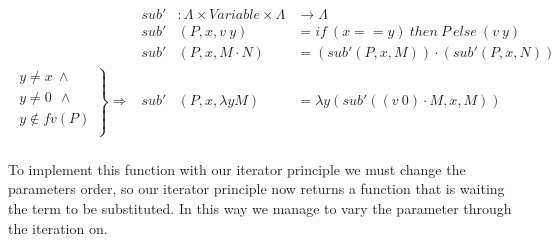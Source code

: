 \documentclass{entcs}
\begin{document}
\[
\begin{array}{rrll}
&sub' &: \Lambda \times Variable \times  \Lambda &   \rightarrow  \Lambda  \\
&sub' &(P , x , v\ y)         &= if\ (x == y)\ then\ P\ else\ (v\ y)   \\
&sub' &(P , x , M \cdot N)    &= (sub' (P , x , M)) \cdot (sub' (P , x , N)) \\
\left. 
\begin{array}{c}
y \neq x  \ \wedge \\
 y \neq 0\ \  \wedge \\
 y \not\in fv(P) \\
\end{array} \right\} \Rightarrow&sub' &(P , x , \lambda y M)   &= \lambda y (sub' ((v\ 0) \cdot M , x , M)) \\
\end{array} \]

To implement this function with our iterator principle we must change the parameters order, so our iterator principle now returns a function that is waiting the term to be substituted. In this way we manage to vary the parameter through the iteration on.

 \hspace{5px}


\end{document}
